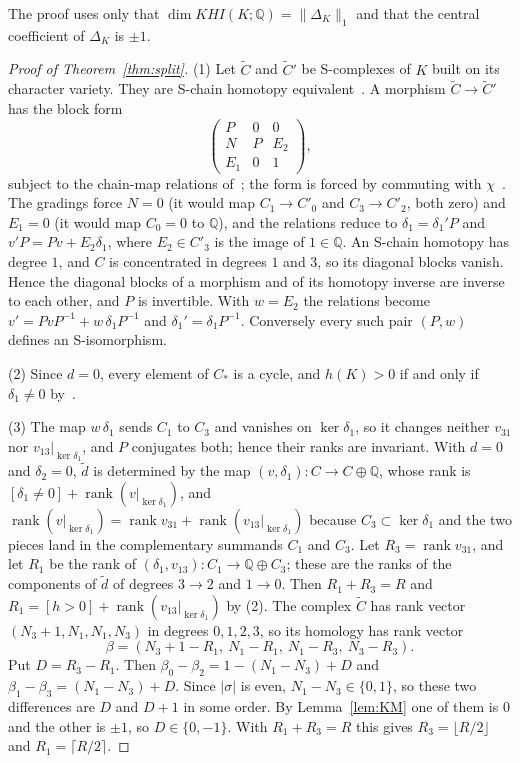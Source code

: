 \documentclass[11pt,reqno]{amsart}
\theoremstyle{plain}
\theoremstyle{definition}
\newcommand{\Q}{\mathbb{Q}}
\newcommand{\td}{\widetilde d}
\newcommand{\tC}{\widetilde C}
\begin{document}
The proof uses only that $\dim KHI(K;\Q)=\|\Delta_K\|_1$ and that the central coefficient of $\Delta_K$ is
$\pm1$.

\begin{proof}[Proof of Theorem~\ref{thm:split}]
(1) Let $\tC$ and $\tC'$ be S-complexes of $K$ built on its character variety. They are S-chain homotopy
equivalent~\cite[Thm.~3.34]{DSEquiv}. A morphism $\tC\to\tC'$ has the block form
\[
\begin{pmatrix}P&0&0\\ N&P&E_2\\ E_1&0&1\end{pmatrix},
\]
subject to the chain-map relations of~\cite[Def.~3.28]{DSEquiv}; the form is forced by commuting with
$\chi$~\cite[\S4.1]{DSEquiv}. The gradings force $N=0$ (it would map $C_1\to C'_0$ and
$C_3\to C'_2$, both zero) and $E_1=0$ (it would map $C_0=0$ to $\Q$), and the relations reduce to
$\delta_1=\delta_1'P$ and $v'P=Pv+E_2\delta_1$, where $E_2\in C'_3$ is the image of $1\in\Q$. An S-chain
homotopy has degree $1$, and $C$ is concentrated in degrees $1$ and $3$, so its diagonal blocks vanish.
Hence the diagonal blocks of a morphism and of its homotopy inverse are inverse to each other, and $P$
is invertible. With $w=E_2$ the
relations become $v'=PvP^{-1}+w\,\delta_1P^{-1}$ and $\delta_1'=\delta_1P^{-1}$. Conversely every such pair
$(P,w)$ defines an S-isomorphism.

(2) Since $d=0$, every element of $C_*$ is a cycle, and $h(K)>0$ if and only if $\delta_1\neq0$
by~\cite[Prop.~4.15]{DSEquiv}.

(3) The map $w\,\delta_1$ sends $C_1$ to $C_3$ and vanishes on $\ker\delta_1$, so it changes neither $v_{31}$
nor $v_{13}|_{\ker\delta_1}$, and $P$ conjugates both; hence their ranks are invariant. With $d=0$ and
$\delta_2=0$, $\td$ is determined by the map $(v,\delta_1)\colon C\to C\oplus\Q$, whose rank is
$[\delta_1\neq0]+\operatorname{rank}(v|_{\ker\delta_1})$, and
$\operatorname{rank}(v|_{\ker\delta_1})=\operatorname{rank}v_{31}+\operatorname{rank}(v_{13}|_{\ker\delta_1})$
because $C_3\subset\ker\delta_1$ and the two pieces land in the complementary summands $C_1$ and $C_3$.
Let $R_3=\operatorname{rank}v_{31}$, and let $R_1$ be the rank of
$(\delta_1,v_{13})\colon C_1\to\Q\oplus C_3$; these are the ranks of the components of $\td$ of degrees
$3\to2$ and $1\to0$. Then $R_1+R_3=R$ and
$R_1=[h>0]+\operatorname{rank}(v_{13}|_{\ker\delta_1})$ by (2). The complex $\tC$ has rank vector
$(N_3+1,N_1,N_1,N_3)$ in degrees $0,1,2,3$, so its homology has rank vector
\[
\beta=(N_3+1-R_1,\ N_1-R_1,\ N_1-R_3,\ N_3-R_3).
\]
Put $D=R_3-R_1$. Then $\beta_0-\beta_2=1-(N_1-N_3)+D$ and $\beta_1-\beta_3=(N_1-N_3)+D$. Since $|\sigma|$ is
even, $N_1-N_3\in\{0,1\}$, so these two differences are $D$ and $D+1$ in some order. By
Lemma~\ref{lem:KM} one of them is $0$ and the other is $\pm1$, so $D\in\{0,-1\}$. With $R_1+R_3=R$ this
gives $R_3=\lfloor R/2\rfloor$ and $R_1=\lceil R/2\rceil$.


\end{proof}
\end{document}
